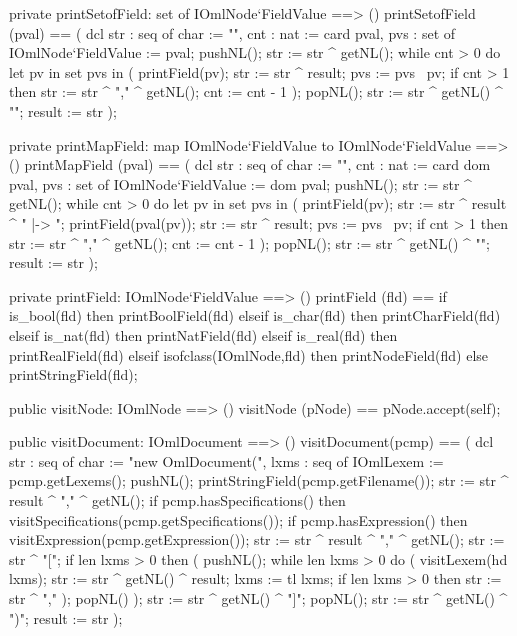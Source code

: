 \begin{vdm_al}
  private printSetofField: set of IOmlNode`FieldValue ==> ()
  printSetofField (pval) ==
    ( dcl str : seq of char := "{", cnt : nat := card pval,
          pvs : set of IOmlNode`FieldValue := pval;
      pushNL();
      str := str ^ getNL();
      while cnt > 0 do
        let pv in set pvs in
          ( printField(pv);
            str := str ^ result;
            pvs := pvs \ {pv};
            if cnt > 1
            then str := str ^ "," ^ getNL();
            cnt := cnt - 1 ); 
      popNL();
      str := str ^ getNL() ^ "}";
      result := str );

  private printMapField: map IOmlNode`FieldValue to IOmlNode`FieldValue ==> ()
  printMapField (pval) == 
    ( dcl str : seq of char := "{", cnt : nat := card dom pval,
          pvs : set of IOmlNode`FieldValue := dom pval;
      pushNL();
      str := str ^ getNL();
      while cnt > 0 do
        let pv in set pvs in
          ( printField(pv);
            str := str ^ result ^ " |-> ";
            printField(pval(pv));
            str := str ^ result;
            pvs := pvs \ {pv};
            if cnt > 1
            then str := str ^ "," ^ getNL();
            cnt := cnt - 1 ); 
      popNL();
      str := str ^ getNL() ^ "}";
      result := str );

  private printField: IOmlNode`FieldValue ==> ()
  printField (fld) ==
    if is_bool(fld) then printBoolField(fld)
    elseif is_char(fld) then printCharField(fld)
    elseif is_nat(fld) then printNatField(fld)
    elseif is_real(fld) then printRealField(fld)
    elseif isofclass(IOmlNode,fld) then printNodeField(fld)
    else printStringField(fld);

  public visitNode: IOmlNode ==> ()
  visitNode (pNode) == pNode.accept(self);

  public visitDocument: IOmlDocument ==> ()
  visitDocument(pcmp) ==
    ( dcl str : seq of char := "new OmlDocument(",
          lxms : seq of IOmlLexem := pcmp.getLexems();
      pushNL();
      printStringField(pcmp.getFilename());
      str := str ^ result ^ "," ^ getNL();
      if pcmp.hasSpecifications() then visitSpecifications(pcmp.getSpecifications());
      if pcmp.hasExpression() then visitExpression(pcmp.getExpression());
      str := str ^ result ^ "," ^ getNL();
      str := str ^ "[";
      if len lxms > 0
      then ( pushNL();
             while len lxms > 0 do
               ( visitLexem(hd lxms);
                 str := str ^ getNL() ^ result;
                 lxms := tl lxms;
                 if len lxms > 0
                 then str := str ^ "," );
             popNL() );
      str := str ^ getNL() ^ "]";
      popNL();
      str := str ^ getNL() ^ ")";
      result := str );


\end{vdm_al}

